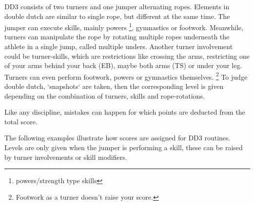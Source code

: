 DD3 consists of two turners and one jumper alternating ropes. Elements in double dutch are similar to single rope, but different at the same time. The jumper can execute skills, mainly powers \footnote{powers/strength type skills}, gymnastics or footwork. Meanwhile, turners can manipulate the rope by rotating multiple ropes underneath the athlete in a single jump, called multiple unders. Another turner involvement could be turner-skills, which are restrictions like crossing the arms, restricting one of your arms behind your back (EB), maybe both arms (TS) or under your leg. Turners can even perform footwork, powers or gymnastics themselves. \footnote{Footwork as a turner doesn't raise your score.}
To judge double dutch, `snapshots` are taken, then the corresponding level is given depending on the combination of turners, skills and rope-rotations.

Like any discipline, mistakes can happen for which points are deducted from the total score.

The following examples illustrate how scores are assigned for DD3 routines. Levels are only given when the jumper is performing a skill, these can be raised by turner involvements or skill modifiers.

